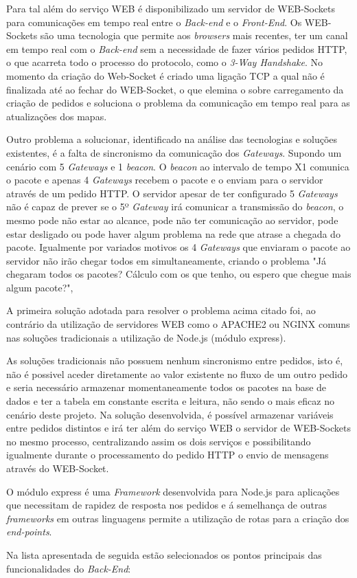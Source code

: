 \par Para tal além do serviço WEB é disponibilizado um servidor de WEB-Sockets para comunicações em tempo real entre o \textit{Back-end} e o \textit{Front-End}. Os WEB-Sockets são uma tecnologia que permite aos \textit{browsers} mais recentes, ter um canal em tempo real com o \textit{Back-end} sem a necessidade de fazer vários pedidos HTTP, o que acarreta todo o processo do protocolo, como o \textit{3-Way Handshake}. No momento da criação do Web-Socket é criado uma ligação TCP a qual não é finalizada até ao fechar do WEB-Socket, o que elemina o sobre carregamento da criação de pedidos e soluciona o problema da comunicação em tempo real para as atualizações dos mapas.

\par Outro problema a solucionar, identificado na análise das tecnologias e soluções existentes, é a falta de sincronismo da comunicação dos \textit{Gateways}. Supondo um cenário com 5 \textit{Gateways} e 1 \textit{beacon}. O \textit{beacon} ao intervalo de tempo X1 comunica o pacote e apenas 4 \textit{Gateways} recebem o pacote e o enviam para o servidor através de um pedido HTTP. O servidor apesar de ter configurado 5 \textit{Gateways} não é capaz de prever se o 5º \textit{Gateway} irá comunicar a transmissão do \textit{beacon}, o mesmo pode não estar ao alcance, pode não ter comunicação ao servidor, pode estar desligado ou pode haver algum problema na rede que atrase a chegada do pacote. Igualmente por variados motivos os 4 \textit{Gateways} que enviaram o pacote ao servidor não irão chegar todos em simultaneamente, criando o problema "Já chegaram todos os pacotes? Cálculo com os que tenho, ou espero que chegue mais algum pacote?",

\par A primeira solução adotada para resolver o problema acima citado foi, ao contrário da utilização de servidores WEB como o APACHE2 ou NGINX comuns nas soluções tradicionais a utilização de Node.js (módulo express). 
\par As soluções tradicionais não possuem nenhum sincronismo entre pedidos, isto é, não é possivel aceder diretamente ao valor existente no fluxo de um outro pedido e seria necessário armazenar momentaneamente todos os pacotes na base de dados e ter a tabela em constante escrita e leitura, não sendo o mais eficaz no cenário deste projeto. Na solução desenvolvida, é possível armazenar variáveis entre pedidos distintos e irá ter além do serviço WEB o servidor de WEB-Sockets no mesmo processo, centralizando assim os dois serviços e possibilitando igualmente durante o processamento do pedido HTTP o envio de mensagens através do WEB-Socket. 
\par O módulo express é uma \textit{Framework} desenvolvida para Node.js para aplicações que necessitam de rapidez de resposta nos pedidos e á semelhança de outras \textit{frameworks} em outras linguagens permite a utilização de rotas para a criação dos \textit{end-points}.
\par Na lista apresentada de seguida estão selecionados os pontos principais das funcionalidades do \textit{Back-End}:

